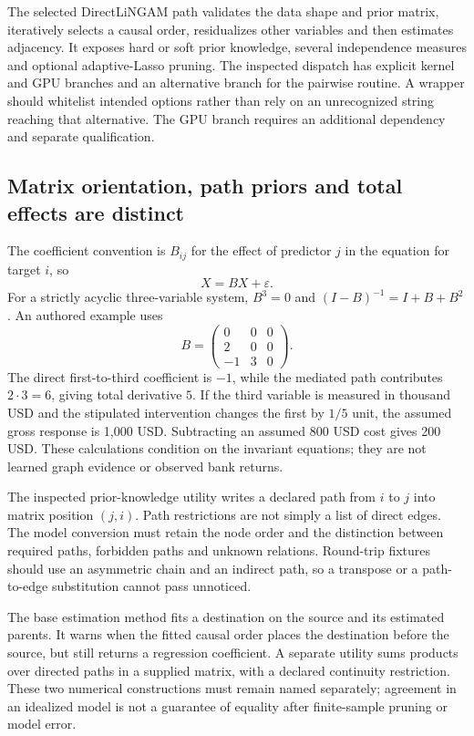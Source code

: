The selected DirectLiNGAM path validates the data shape and prior matrix,
iteratively selects a causal order, residualizes other variables and then
estimates adjacency. It exposes hard or soft prior knowledge, several
independence measures and optional adaptive-Lasso pruning. The inspected
dispatch has explicit kernel and GPU branches and an alternative branch
for the pairwise routine. A wrapper should whitelist intended options
rather than rely on an unrecognized string reaching that alternative.
The GPU branch requires an additional dependency and separate qualification.
\citep{exec24_lingam_source}

\subsection{Matrix orientation, path priors and total effects are distinct}
The coefficient convention is $B_{ij}$ for the effect of predictor $j$
in the equation for target $i$, so
\[
 X=BX+\varepsilon.
\]
For a strictly acyclic three-variable system, $B^3=0$ and
$(I-B)^{-1}=I+B+B^2$. An authored example uses
\[
 B=\begin{pmatrix}0&0&0\\2&0&0\\-1&3&0\end{pmatrix}.
\]
The direct first-to-third coefficient is $-1$, while the mediated path
contributes $2\cdot3=6$, giving total derivative $5$. If the third variable
is measured in thousand USD and the stipulated intervention changes the
first by $1/5$ unit, the assumed gross response is 1,000 USD. Subtracting
an assumed 800 USD cost gives 200 USD. These calculations condition on
the invariant equations; they are not learned graph evidence or observed
bank returns.\citep{exec24_lingam_choice}

The inspected prior-knowledge utility writes a declared path from $i$ to
$j$ into matrix position $(j,i)$. Path restrictions are not simply a list
of direct edges. The model conversion must retain the node order and the
distinction between required paths, forbidden paths and unknown relations.
Round-trip fixtures should use an asymmetric chain and an indirect path,
so a transpose or a path-to-edge substitution cannot pass unnoticed.
\citep{exec24_lingam_source,exec24_lingam_choice}

The base estimation method fits a destination on the source and its
estimated parents. It warns when the fitted causal order places the
destination before the source, but still returns a regression coefficient.
A separate utility sums products over directed paths in a supplied matrix,
with a declared continuity restriction. These two numerical constructions
must remain named separately; agreement in an idealized model is not a
guarantee of equality after finite-sample pruning or model error.
\citep{exec24_lingam_source}

